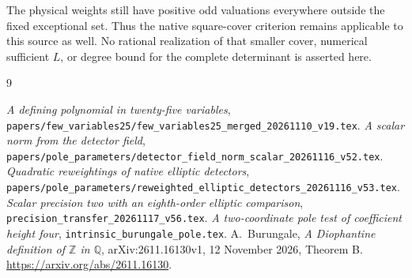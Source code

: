 \documentclass[11pt,a4paper]{article}
\newcommand{\Q}{\mathbb Q}\newcommand{\Z}{\mathbb Z}
\begin{document}
The physical weights still have positive odd valuations everywhere
outside the fixed exceptional set. Thus the native square-cover
criterion remains applicable to this source as well. No rational
realization of that smaller cover, numerical sufficient \(L\), or
degree bound for the complete determinant is asserted here.

\begin{thebibliography}{9}\raggedright
{}\emph{A defining polynomial in twenty-five variables},
\nolinkurl{papers/few_variables25/few_variables25_merged_20261110_v19.tex}.
\emph{A scalar norm from the detector field},
\nolinkurl{papers/pole_parameters/detector_field_norm_scalar_20261116_v52.tex}.
\emph{Quadratic reweightings of native elliptic detectors},
\nolinkurl{papers/pole_parameters/reweighted_elliptic_detectors_20261116_v53.tex}.
\emph{Scalar precision two with an eighth-order elliptic comparison},
\nolinkurl{precision_transfer_20261117_v56.tex}.
\emph{A two-coordinate pole test of coefficient height four},
\nolinkurl{intrinsic_burungale_pole.tex}.
A.~Burungale,
\emph{A Diophantine definition of $\Z$ in $\Q$},
arXiv:2611.16130v1, 12 November 2026, Theorem B.
\url{https://arxiv.org/abs/2611.16130}.
\end{thebibliography}
\end{document}
